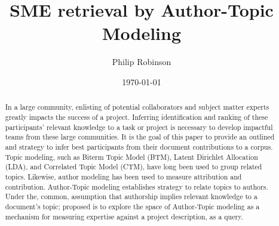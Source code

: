 \documentclass{article}
\title{SME retrieval by Author-Topic Modeling}
\date{\today}
\author{Philip Robinson}
\affil{NASA: Jet Propoultion Labratory}
\begin{document}
\maketitle

\begin{abstract}
  In a large community, enlisting of potential collaborators and subject matter experts
  greatly impacts the success of a project. Inferring identification and ranking of
  these participants' relevant knowledge to a task or project is necessary to develop
  impactful teams from these large communities\cite{Minto2007}. It is the goal of this
  paper to provide an outlined and strategy to infer best participants from their
  document contributions to a corpus. Topic modeling, such as Biterm Topic Model (BTM)\cite{Yan2013,Chen2015}, Latent Dirichlet Allocation (LDA),
  and Correlated Topic Model (CTM), have long been used to group related topics\cite{Alghamdi2015}. Likewise,
  author modeling has been used to measure attribution\cite{Rexha2018} and
  contribution\cite{AldebeiHJ016}. Author-Topic modeling establishes strategy to
  relate topics to authors\cite{Rosen-Zvi2004}. Under the, common, assumption that
  authorship implies relevant knowledge to a document's topic; proposed is to explore
  the space of Author-Topic modeling as a mechanism for measuring expertise against a
  project description, as a query.
\end{abstract}

\end{document}
